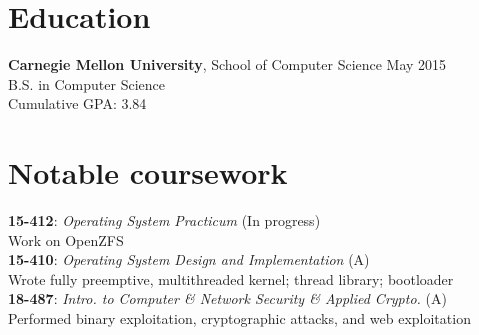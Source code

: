 \documentclass[margin]{res}
\newcommand{\course}[4]{ %
    \textbf{#1}: \textit{#2} (#4)\\
      #3
      \vspace{1em}
    \\}
\begin{document}

\address{
  5032 Forbes Avenue SMC 6899 \\
  Pittsburgh, PA 15289-6899 \\
  (302) 468-7537
}
\address{  %
  \hfill \href{mailto:joshz@joshz.org}{joshz@joshz.org} \\
  \hfill
    \href{https://github.com/joshzimmerman}{https://github.com/joshzimmerman} \\
  \hfill \href{http://joshz.org}{http://joshz.org}
}

\begin{resume}

\section{Education}
  \textbf{Carnegie Mellon University}, School of Computer Science
    \hfill May 2015\\
  B.S. in Computer Science\\
  Cumulative GPA: 3.84

\section{Notable coursework}
 \course{15-412}{Operating System Practicum}{Work on OpenZFS}{In progress}
 \course{15-410}{Operating System Design and Implementation}
 {Wrote fully preemptive, multithreaded kernel; thread library; bootloader}{A}
  \course{18-487}{Intro. to Computer \& Network Security \& Applied Crypto.}
 {Performed binary exploitation, cryptographic attacks, and web exploitation}{A}
      \vspace{-2em}



\end{resume}
\end{document}
